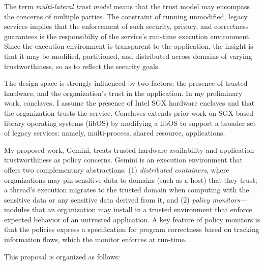 

The term \emph{multi-lateral trust model} means that the trust model may
encompass the concerns of multiple parties.
%
The constraint of running unmodified, legacy services implies that the
enforcement of such security, privacy, and correctness guarantees is the
responsibilty of the service's run-time execution environment. 
%
Since the execution environment is transparent to the application, the insight
is that it may be modified, partitioned, and distributed across domains of
varying trustworthiness, so as to reflect the security goals.


The design space is strongly influenced by two factors: the presence of trusted
hardware, and the organization's trust in the application.
%
%
In my preliminary work, conclaves, I assume the presence of Intel SGX hardware
enclaves and that the organization trusts the service.
%
Conclaves extends prior work on SGX-based library operating systems (libOS) by
modifying a libOS to support a broader set of legacy services: namely,
multi-process, shared resource, applications.

%


My proposed work, Gemini, treats trusted hardware availability and
application trustworthiness as policy concerns.
%
Gemini is an execution environment that offers two complementary abstractions:
(1) \emph{distributed containers}, where organizations may pin sensitive data to
domains (such as a host) that they trust; a thread's execution migrates to the
trusted domain when computing with the sensitive data or any sensitive data
derived from it, and (2) \emph{policy monitors}---modules that an organization
may install in a trusted environment that enforce expected behavior of an
untrusted application.
%
A key feature of policy monitors is that the policies express a specification
for program correctness based on tracking information flows, which
the monitor enforces at run-time.

This proposal is organized as follows:

